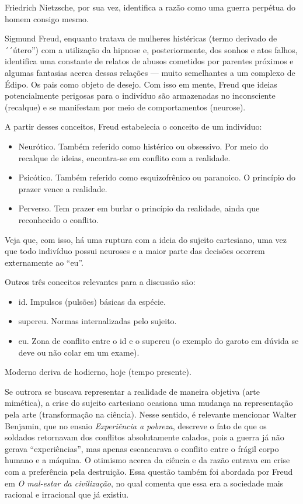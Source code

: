 Friedrich Nietzsche, por sua vez, identifica a razão como uma guerra perpétua do homem consigo mesmo.

Sigmund Freud, enquanto tratava de mulheres histéricas (termo derivado de ´´útero'') com a utilização da hipnose e, posteriormente, dos sonhos e atos falhos, identifica uma constante de relatos de abusos cometidos por parentes próximos e algumas fantasias acerca dessas relações — muito semelhantes a um complexo de Édipo. Os pais como objeto de desejo. Com isso em mente, Freud que ideias potencialmente perigosas para o indivíduo são armazenadas no inconsciente (recalque) e se manifestam por meio de comportamentos (neurose). 

A partir desses conceitos, Freud estabelecia o conceito de um indivíduo:

\begin{itemize}
    \item Neurótico. Também referido como histérico ou obsessivo. Por meio do recalque de ideias, encontra-se em conflito com a realidade.
    \item Psicótico. Também referido como esquizofrênico ou paranoico. O princípio do prazer vence a realidade.
    \item Perverso. Tem prazer em burlar o princípio da realidade, ainda que reconhecido o conflito.
\end{itemize}

Veja que, com isso, há uma ruptura com a ideia do sujeito cartesiano, uma vez que todo indivíduo possui neuroses e a maior parte das decisões ocorrem externamente ao ``eu''.

Outros três conceitos relevantes para a discussão são:

\begin{itemize}
    \item id. Impulsos (pulsões) básicas da espécie.
    \item supereu. Normas internalizadas pelo sujeito.
    \item eu. Zona de conflito entre o id e o supereu (o exemplo do garoto em dúvida se deve ou não colar em um exame).
\end{itemize}

Moderno deriva de hodierno, hoje (tempo presente).

Se outrora se buscava representar a realidade de maneira objetiva (arte mimética), a crise do sujeito cartesiano ocasiona uma mudança na representação pela arte (transformação na ciência). Nesse sentido, é relevante mencionar Walter Benjamin, que no ensaio \textit{Experiência a pobreza}, descreve o fato de que os soldados retornavam dos conflitos absolutamente calados, pois a guerra já não gerava ``experiências'', mas apenas escancarava o conflito entre o frágil corpo humano e a máquina. O otimismo acerca da ciência e da razão entrava em crise com a preferência pela destruição. Essa questão também foi abordada por Freud em \textit{O mal-estar da civilização}, no qual comenta que essa era a sociedade mais racional e irracional que já existiu.

